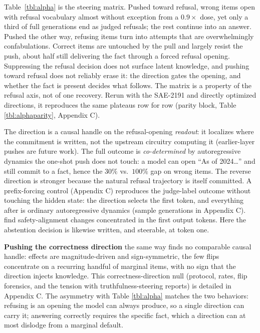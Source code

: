 Table~\ref{tbl:alpha} is the steering matrix. Pushed toward refusal,
wrong items open with refusal vocabulary almost without exception from a
\(0.9\times\) dose, yet only a third of full generations end as judged refusals; the rest continue into an answer. Pushed the other way, refusing items turn into attempts that are overwhelmingly confabulations. Correct items are untouched by the pull and largely resist the push, about half still delivering the fact through a forced refusal opening.
Suppressing the refusal decision does not surface latent knowledge, and pushing
toward refusal does not reliably erase it: the direction gates the
opening, and whether the fact is present decides what
follows. The matrix is a property of the refusal axis, not of one recovery. Rerun with the SAE-2191 and directly optimized directions, it reproduces the same plateaus row for row (parity block, Table \ref{tbl:alphaparity}, Appendix C).

The direction is a causal handle on the
refusal-opening \emph{readout}: it localizes where the commitment is
written, not the upstream circuitry computing it (earlier-layer pushes are future work). The full outcome is \emph{co-determined} by autoregressive dynamics the one-shot push does not touch: a model can open ``As of 2024\ldots{}'' and still commit to a fact, hence the \(30\%\) vs.~\(100\%\) gap on wrong items. The reverse direction is stronger because the natural refusal trajectory is itself committed. A prefix-forcing control (Appendix C) reproduces the
judge-label outcome without touching the hidden state: the direction selects the first token, and everything after is ordinary autoregressive dynamics (sample generations in Appendix C).
\citet{qi2025shallow} find safety-alignment changes concentrated in the first output tokens. Here the abstention decision is likewise written, and steerable, at token one.

\textbf{Pushing the correctness direction} the same way finds no
comparable causal handle: effects are magnitude-driven and
sign-symmetric, the few flips concentrate on a recurring handful of
marginal items, with no sign that the direction injects knowledge. This correctness-direction null (protocol, rates, flip forensics, and the tension with truthfulness-steering reports) is detailed in Appendix C. The asymmetry with Table \ref{tbl:alpha} matches the two behaviors: refusing is an opening the model can always produce, so a single direction can carry it; answering correctly requires the specific fact, which a direction can at most dislodge from a marginal default.


